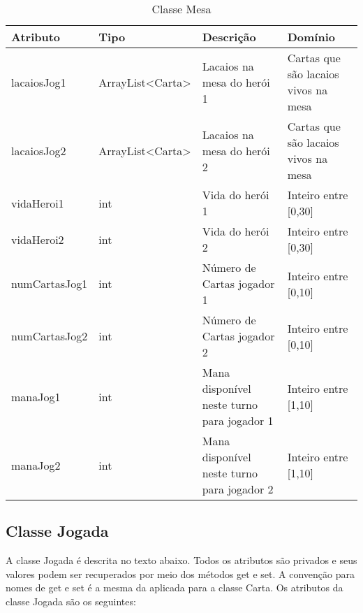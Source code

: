 \documentclass[10pt]{article}
\begin{document}
\renewcommand{\arraystretch}{1.15}
\begin{table}[h]
\centering
\caption{Classe Mesa}
\label{tab:mesa}
\begin{tabular}{|l|l|p{4cm}|p{4cm}|}
\hline
Atributo & Tipo & Descrição & Domínio \\ \hline
lacaiosJog1   & ArrayList<Carta> & Lacaios na mesa do herói 1 & Cartas que são lacaios vivos na mesa \\ \hline
lacaiosJog2   & ArrayList<Carta> & Lacaios na mesa do herói 2 & Cartas que são lacaios vivos na mesa \\ \hline
vidaHeroi1      & int & Vida do herói 1 & Inteiro entre [0,30] \\ \hline
vidaHeroi2      & int & Vida do herói 2 & Inteiro entre [0,30] \\ \hline
numCartasJog1   & int & Número de Cartas jogador 1 & Inteiro entre [0,10] \\ \hline
numCartasJog2   & int & Número de Cartas jogador 2  & Inteiro entre [0,10] \\ \hline
manaJog1      & int & Mana disponível neste turno para jogador 1 & Inteiro entre [1,10] \\ \hline
manaJog2      & int & Mana disponível neste turno para jogador 2 & Inteiro entre [1,10] \\ \hline
\end{tabular}
\end{table}

\subsection{Classe Jogada}

A classe Jogada é descrita no texto abaixo. Todos os atributos são privados e seus valores podem ser recuperados por meio dos métodos get e set. A convenção para nomes de get e set é a mesma da aplicada para a classe Carta. Os atributos da classe Jogada são os seguintes:
\end{document}
